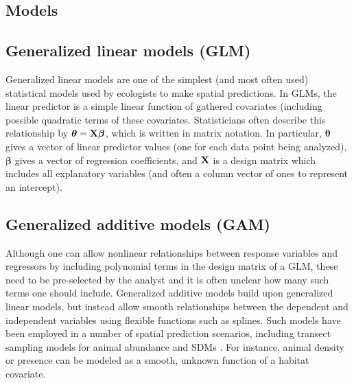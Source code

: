 \documentclass[12pt,fleqn]{article}
\begin{document}
\begin{flushleft}
\section{Models}
\subsection{Generalized linear models (GLM)}

Generalized linear models \citep{McCullaghNelder1989} are one of the simplest (and most often used) statistical models
used by ecologists to make spatial predictions. In GLMs, the linear predictor is a simple linear function of gathered covariates
(including possible quadratic terms of these covariates.  Statisticians often describe this relationship by
$\boldsymbol{\theta}={\bf X} \boldsymbol{\beta}$, which is written in matrix notation.  In particular, $\boldsymbol{\theta}$ gives
a vector of linear predictor values (one for each data point being analyzed), $\boldsymbol{\beta}$ gives a vector of regression coefficients, and ${\bf X}$ is a design matrix which includes all explanatory variables (and often a column vector of ones to represent an intercept).

\subsection{Generalized additive models (GAM)}

Although one can allow nonlinear relationships between response variables and regressors by including polynomial terms in the design matrix of a GLM, these need to be pre-selected by the analyst and it is often unclear how many such terms one should include. Generalized additive models \citep[GAMs;][]{HastieTibshirani1999,Wood2006} build upon generalized linear models, but instead allow smooth relationships between the dependent and independent variables using flexible functions such as splines.  Such models have
been employed in a number of spatial prediction scenarios, including transect sampling models for animal abundance \citep{HedleyBuckland2004} and SDMs \citep{GuisanEtAl2002}.  For instance, animal density or presence can be modeled as a smooth, unknown function of a habitat covariate.


\end{flushleft}
\end{document}
